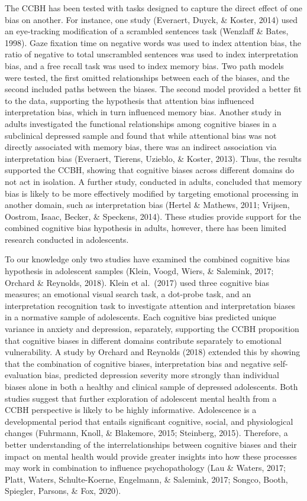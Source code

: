 \documentclass[
  english,
  man,floatsintext]{apa6}
\begin{document}
The CCBH has been tested with tasks designed to capture the direct effect of one bias on another. For instance, one study (Everaert, Duyck, \& Koster, 2014) used an eye-tracking modification of a scrambled sentences task (Wenzlaff \& Bates, 1998). Gaze fixation time on negative words was used to index attention bias, the ratio of negative to total unscrambled sentences was used to index interpretation bias, and a free recall task was used to index memory bias. Two path models were tested, the first omitted relationships between each of the biases, and the second included paths between the biases. The second model provided a better fit to the data, supporting the hypothesis that attention bias influenced interpretation bias, which in turn influenced memory bias. Another study in adults investigated the functional relationships among cognitive biases in a subclinical depressed sample and found that while attentional bias was not directly associated with memory bias, there was an indirect association via interpretation bias (Everaert, Tierens, Uzieblo, \& Koster, 2013). Thus, the results supported the CCBH, showing that cognitive biases across different domains do not act in isolation. A further study, conducted in adults, concluded that memory bias is likely to be more effectively modified by targeting emotional processing in another domain, such as interpretation bias (Hertel \& Mathews, 2011; Vrijsen, Oostrom, Isaac, Becker, \& Speckens, 2014). These studies provide support for the combined cognitive bias hypothesis in adults, however, there has been limited research conducted in adolescents.

To our knowledge only two studies have examined the combined cognitive bias hypothesis in adolescent samples (Klein, Voogd, Wiers, \& Salemink, 2017; Orchard \& Reynolds, 2018). Klein et al.~(2017) used three cognitive bias measures; an emotional visual search task, a dot-probe task, and an interpretation recognition task to investigate attention and interpretation biases in a normative sample of adolescents. Each cognitive bias predicted unique variance in anxiety and depression, separately, supporting the CCBH proposition that cognitive biases in different domains contribute separately to emotional vulnerability. A study by Orchard and Reynolds (2018) extended this by showing that the combination of cognitive biases, interpretation bias and negative self-evaluation bias, predicted depression severity more strongly than individual biases alone in both a healthy and clinical sample of depressed adolescents. Both studies suggest that further exploration of adolescent mental health from a CCBH perspective is likely to be highly informative. Adolescence is a developmental period that entails significant cognitive, social, and physiological changes (Fuhrmann, Knoll, \& Blakemore, 2015; Steinberg, 2015). Therefore, a better understanding of the interrelationships between cognitive biases and their impact on mental health would provide greater insights into how these processes may work in combination to influence psychopathology (Lau \& Waters, 2017; Platt, Waters, Schulte-Koerne, Engelmann, \& Salemink, 2017; Songco, Booth, Spiegler, Parsons, \& Fox, 2020).
\end{document}
